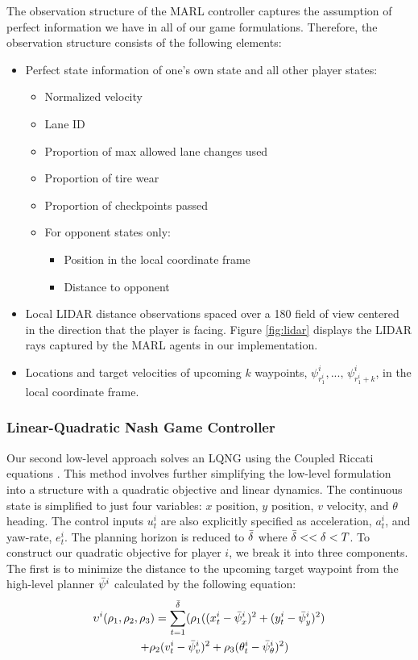 The observation structure of the MARL controller captures the assumption of perfect information we have in all of our game formulations. Therefore, the observation structure consists of the following elements:
\begin{itemize}
    \item Perfect state information of one's own state and all other player states:
    \begin{itemize}
        \item Normalized velocity
        \item Lane ID
        \item Proportion of max allowed lane changes used
        \item Proportion of tire wear
        \item Proportion of checkpoints passed
        \item For opponent states only: 
        \begin{itemize}
            \item Position in the local coordinate frame
            \item Distance to opponent
        \end{itemize}
        \end{itemize}
    \item Local LIDAR distance observations spaced over a 180\textdegree{} field of view centered in the direction that the player is facing. Figure \ref{fig:lidar} displays the LIDAR rays captured by the MARL agents in our implementation.
    \item Locations and target velocities of upcoming $k$ waypoints, $\psi^i_{r^i_{1}}, ..., \, \psi^i_{r^i_{1} + k}$, in the local coordinate frame. 
\end{itemize}

\subsubsection{Linear-Quadratic Nash Game Controller}
Our second low-level approach solves an LQNG using the Coupled Riccati equations \cite{basar}. This method involves further simplifying the low-level formulation into a structure with a quadratic objective and linear dynamics. The continuous state is simplified to just four variables: $x$ position, $y$ position, $v$ velocity, and $\theta$ heading. The control inputs $u^i_t$ are also explicitly specified as acceleration, $a^i_t$, and yaw-rate, $e^i_t$. The planning horizon is reduced to $\Bar{\delta}$ where $\Bar{\delta} << \delta < T$. To construct our quadratic objective for player $i$, we break it into three components. The first is to minimize the distance to the upcoming target waypoint from the high-level planner $\Bar{\psi}^i$ calculated by the following equation:
\begin{multline} \label{eq:lqng_obj1}
\upsilon^i(\rho_1, \rho_2,\rho_3) =  \sum_{t = 1}^{\Bar{\delta}} (\rho_1((x^i_{t} - \Bar{\psi}^i_x)^2 + (y^i_{t} - \Bar{\psi}^i_y)^2) \\   \quad + \rho_2 (v^i_{t} - \Bar{\psi}^i_v)^2 
 + \rho_3 (\theta^i_{t} - \Bar{\psi}^i_\theta)^2)
\end{multline}

